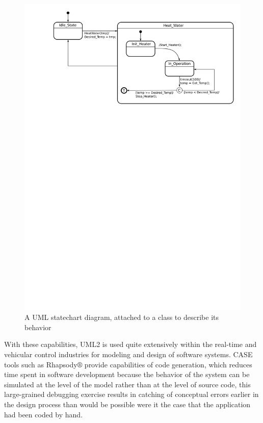 \begin{figure}
\centering
\includegraphics[scale=0.5]{figs/statechart}
\caption{A UML statechart diagram, attached to a class to describe its
  behavior}
\label{fig:statechart}
\end{figure}

With these capabilities, UML2 is used quite extensively within the
real-time and vehicular control industries for modeling and design of
software systems. CASE tools such as Rhapsody$\circledR$ provide
capabilities of code generation, which reduces time spent in software
development because the behavior of the system can be simulated at the
level of the model rather than at the level of source code, this
large-grained debugging exercise results in catching of conceptual
errors earlier in the design process than would be possible were it
the case that the application had been coded by hand.

